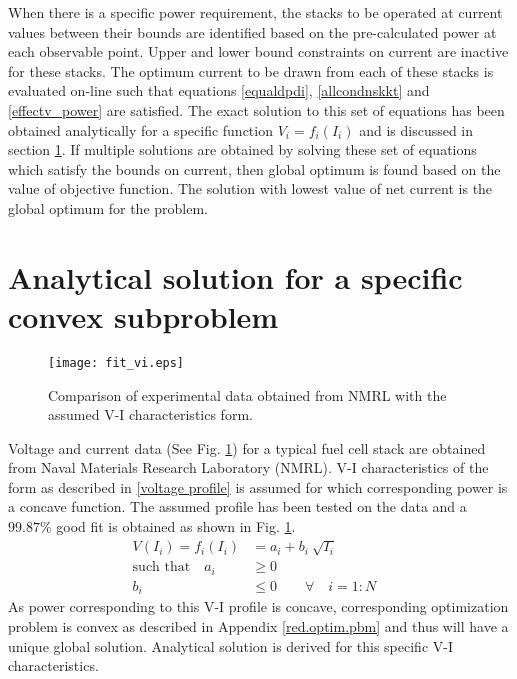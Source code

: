 \documentclass[twocolumn]{autart}
\begin{document}
When there is a specific power requirement, the stacks to be operated at current values between their bounds are identified based on the pre-calculated power at each observable point. Upper and lower bound constraints on current are inactive for these stacks. The optimum current to be drawn from each of these stacks is evaluated on-line such that equations \eqref{equaldpdi}, \eqref{allcondnskkt} and \eqref{effectv_power} are satisfied. The exact solution to this set of equations has been obtained analytically for a specific function $ V_i = f_i(I_i)$ and is discussed in section \ref{anlyt}. If multiple solutions are obtained by solving these set of equations which satisfy the bounds on current, then global optimum is found based on the value of objective function. The solution with lowest value of net current is the global optimum for the problem.
 


\section{Analytical solution for a specific convex  subproblem}
\label{anlyt}
\begin{figure}[htbp]
\centering
\texttt{[image: fit\_vi.eps]}
\caption{Comparison of experimental data obtained from NMRL with the assumed V-I characteristics form.}
\label{examplevi}
\vskip-0.2cm
\end{figure}
Voltage and current data (See Fig. \ref{examplevi}) for a typical fuel cell stack are obtained from Naval Materials Research Laboratory (NMRL). V-I characteristics of the form as described in \eqref{voltage profile} is assumed for which corresponding power is a concave function. The assumed profile has been tested on the data and a $99.87 \%$ good fit is obtained as shown in Fig. \ref{examplevi}.
\begin{subequations}
\label{voltage profile}
\begin{align}
V(I_i) = f_i(I_i) &= a_i + b_i \ \sqrt{I_i} \\
\text{such that} \quad a_{i} &\geq 0 \\
b_{i} &\leq 0 \qquad \forall \quad i=1:N &
\end{align}
\end{subequations}
As power corresponding to this V-I profile is concave, corresponding optimization problem is convex as described in Appendix \ref{red.optim.pbm} and thus will have a unique global solution. Analytical solution is derived for this specific V-I characteristics. 
\end{document}
